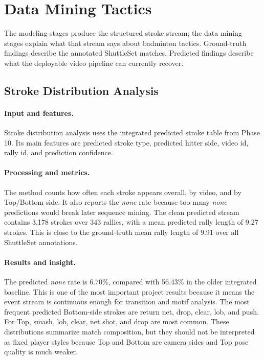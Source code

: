\documentclass{article}
\begin{document}
\section{Data Mining Tactics}

The modeling stages produce the structured stroke stream; the data mining
stages explain what that stream says about badminton tactics. Ground-truth
findings describe the annotated ShuttleSet matches. Predicted findings
describe what the deployable video pipeline can currently recover.

\subsection{Stroke Distribution Analysis}

\paragraph{Input and features.}
Stroke distribution analysis uses the integrated predicted stroke table from
Phase 10. Its main features are predicted stroke type, predicted hitter side,
video id, rally id, and prediction confidence.

\paragraph{Processing and metrics.}
The method counts how often each stroke appears overall, by video, and by
Top/Bottom side. It also reports the \emph{none} rate because too many
\emph{none} predictions would break later sequence mining. The clean predicted
stream contains 3,178 strokes over 343 rallies, with a mean predicted rally
length of 9.27 strokes. This is close to the ground-truth mean rally length of
9.91 over all ShuttleSet annotations.

\paragraph{Results and insight.}
The predicted \emph{none} rate is 6.70\%, compared with 56.43\% in the older
integrated baseline. This is one of the most important project results because
it means the event stream is continuous enough for transition and motif
analysis. The most frequent predicted Bottom-side strokes are return net,
drop, clear, lob, and push. For Top, smash, lob, clear, net shot, and drop are
most common. These distributions summarize match composition, but they should
not be interpreted as fixed player styles because Top and Bottom are camera
sides and Top pose quality is much weaker.
\end{document}
